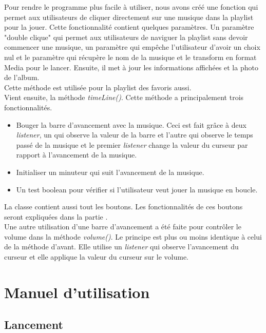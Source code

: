 \documentclass[a4paper,12pt]{report} %
\begin{document}
	Pour rendre le programme plus facile à utiliser, nous avons créé une fonction qui permet aux utilisateurs de cliquer directement sur une musique dans la playlist pour la jouer. Cette fonctionnalité contient quelques paramètres. Un paramètre "double clique" qui permet aux utilisateurs de naviguer la playlist sans devoir commencer une musique, un paramètre qui empêche l'utilisateur d'avoir un choix nul et le paramètre qui récupère le nom de la musique et le transform en format Media pour le lancer. Ensuite, il met à jour les informations affichées et la photo de l'album.\\
Cette méthode est utilisée pour la playlist des favoris aussi.\\

	Vient ensuite, la méthode \textit{timeLine()}. Cette méthode a principalement trois fonctionnalités. 
	\begin{itemize}
  		\item Bouger la barre d'avancement avec la musique. Ceci est fait grâce à deux \textit{listener}, un qui observe la valeur de la barre et l'autre qui observe le temps passé de la musique et le premier \textit{listener} change la valeur du curseur par rapport à l'avancement de la musique.
  		\item Initialiser un minuteur qui suit l'avancement de la musique.
  		\item Un test boolean pour vérifier si l'utilisateur veut jouer la musique en boucle.
	\end{itemize}
	\vspace{5mm}	
	La classe contient aussi tout les boutons. Les fonctionnalités de ces boutons seront expliquées dans la partie \underline{}.\\
	
	Une autre utilisation d'une barre d'avancement a été faite pour contrôler le volume dans la méthode \textit{volume()}. Le principe est plus ou moins identique à celui de la méthode d'avant. Elle utilise un \textit{listener} qui observe l'avancement du curseur et elle applique la valeur du curseur sur le volume.

\section{Manuel d'utilisation}

\subsection{Lancement}
\end{document}

